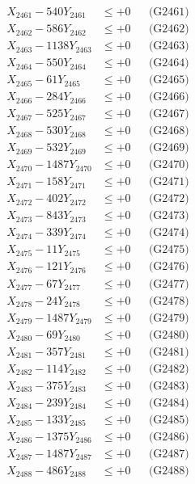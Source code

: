 \documentclass[a4paper,10pt]{article}
\begin{document}
{\begin{align}
\allowbreak
X_{2461} - 540Y_{2461} &\leq +0 && \text{(G2461)} \\
X_{2462} - 586Y_{2462} &\leq +0 && \text{(G2462)} \\
X_{2463} - 1138Y_{2463} &\leq +0 && \text{(G2463)} \\
X_{2464} - 550Y_{2464} &\leq +0 && \text{(G2464)} \\
X_{2465} - 61Y_{2465} &\leq +0 && \text{(G2465)} \\
X_{2466} - 284Y_{2466} &\leq +0 && \text{(G2466)} \\
X_{2467} - 525Y_{2467} &\leq +0 && \text{(G2467)} \\
X_{2468} - 530Y_{2468} &\leq +0 && \text{(G2468)} \\
X_{2469} - 532Y_{2469} &\leq +0 && \text{(G2469)} \\
X_{2470} - 1487Y_{2470} &\leq +0 && \text{(G2470)} \\
\allowbreak
X_{2471} - 158Y_{2471} &\leq +0 && \text{(G2471)} \\
X_{2472} - 402Y_{2472} &\leq +0 && \text{(G2472)} \\
X_{2473} - 843Y_{2473} &\leq +0 && \text{(G2473)} \\
X_{2474} - 339Y_{2474} &\leq +0 && \text{(G2474)} \\
X_{2475} - 11Y_{2475} &\leq +0 && \text{(G2475)} \\
X_{2476} - 121Y_{2476} &\leq +0 && \text{(G2476)} \\
X_{2477} - 67Y_{2477} &\leq +0 && \text{(G2477)} \\
X_{2478} - 24Y_{2478} &\leq +0 && \text{(G2478)} \\
X_{2479} - 1487Y_{2479} &\leq +0 && \text{(G2479)} \\
X_{2480} - 69Y_{2480} &\leq +0 && \text{(G2480)} \\
\allowbreak
X_{2481} - 357Y_{2481} &\leq +0 && \text{(G2481)} \\
X_{2482} - 114Y_{2482} &\leq +0 && \text{(G2482)} \\
X_{2483} - 375Y_{2483} &\leq +0 && \text{(G2483)} \\
X_{2484} - 239Y_{2484} &\leq +0 && \text{(G2484)} \\
X_{2485} - 133Y_{2485} &\leq +0 && \text{(G2485)} \\
X_{2486} - 1375Y_{2486} &\leq +0 && \text{(G2486)} \\
X_{2487} - 1487Y_{2487} &\leq +0 && \text{(G2487)} \\
X_{2488} - 486Y_{2488} &\leq +0 && \text{(G2488)} \\

\end{align}}
\end{document}
